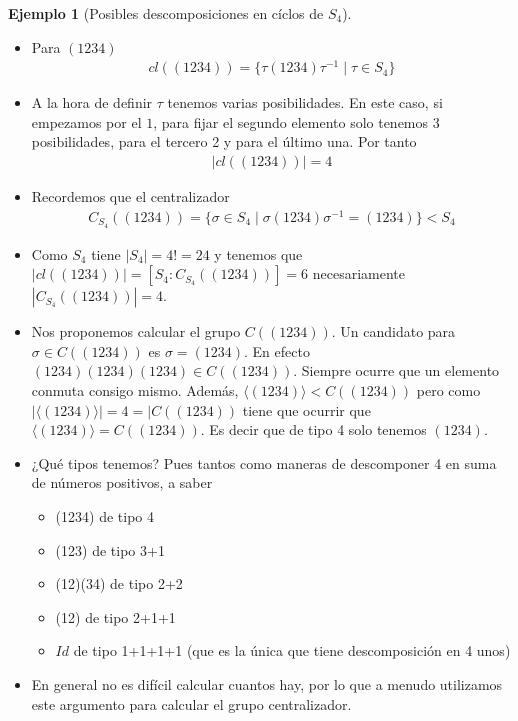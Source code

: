 \documentclass{book}
\theoremstyle{definition}
\newtheorem{ej}{Ejemplo}
\theoremstyle{remark}
\newcommand{\inv}[1]{#1^{-1}}
\begin{document}
\begin{ej}[Posibles descomposiciones en cíclos de $S_4$]
	\begin{itemize}
		\item Para $(1234)$
		\begin{align*}
			cl((1234)) = \{\tau(1234)\inv{\tau} \mid \tau \in S_4\}
		\end{align*}
		\item A la hora de definir $\tau$ tenemos varias posibilidades. En este caso, si empezamos por el $1$, para fijar el segundo elemento solo tenemos 3 posibilidades, para el tercero 2 y para el último una. Por tanto
		\begin{align*}
			|cl((1234))| = 4
		\end{align*}
		
		\item Recordemos que el centralizador
		\begin{align*}
			C_{S_4}((1234)) = \{\sigma \in S_4 \mid \sigma (1234) \inv{\sigma} = (1234)\} < S_4
		\end{align*}
		
		\item Como $S_4$ tiene $|S_4| = 4! = 24$ y tenemos que $|cl((1234))| = [S_4 : C_{S_4}((1234))] = 6$ necesariamente $|C_{S_4}((1234))| = 4$.
		
		\item Nos proponemos calcular el grupo $C((1234))$. Un candidato para $\sigma \in C((1234))$ es $\sigma = (1234)$. En efecto $(1234)(1234)(1234) \in C((1234))$. Siempre ocurre que un elemento conmuta consigo mismo. Además, $\langle (1234) \rangle < C((1234))$ pero como $|\langle (1234) \rangle| = 4 = |C((1234))$ tiene que ocurrir que $\langle (1234) \rangle = C((1234))$. Es decir que de tipo 4 solo tenemos $(1234)$.
		
		\item ¿Qué tipos tenemos? Pues tantos como maneras de descomponer 4 en suma de números positivos, a saber
		\begin{itemize}
			\item (1234) de tipo 4
			\item (123) de tipo 3+1
			\item (12)(34) de tipo 2+2
			\item (12) de tipo 2+1+1
			\item $Id$ de tipo 1+1+1+1 (que es la única que tiene descomposición en 4 unos)
		\end{itemize}

		\item En general no es difícil calcular cuantos hay, por lo que a menudo utilizamos este argumento para calcular el grupo centralizador.
		

\end{itemize}
\end{ej}
\end{document}
